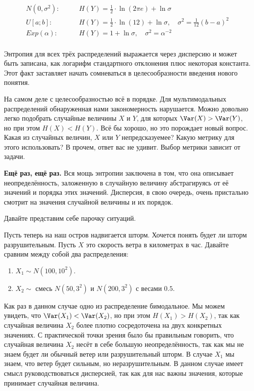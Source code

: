 \begin{equation*}
\begin{aligned}
 N(0,\sigma^2):  \qquad  &H(Y)  = \frac{1}{2} \cdot \ln(2 \pi e) + \ln \sigma \\
 U[a;b]:         \qquad     &H(Y) = \frac{1}{2} \cdot \ln(12) + \ln \sigma,  \quad  \sigma^2 = \frac{1}{12}(b-a)^2 \\ 
 Exp(\alpha):      \qquad &H(Y) = 1 + \ln \sigma, \quad \sigma^2 = \alpha^{-2}\\
\end{aligned}
\end{equation*}

 Энтропия для всех трёх распределений выражается через дисперсию и может быть записана, как логарифм стандартного отклонения плюс некоторая константа. Этот факт заставляет начать сомневаться в целесообразности введения нового понятия.

На самом деле с целесообразностью всё в порядке. Для мультимодальных распределений обнаруженная нами закономерность нарушается. Можно довольно легко подобрать случайные величины $X$ и $Y$, для которых $\Var(X) > \Var(Y)$, но при этом $H(X) < H(Y)$. Всё бы хорошо, но это порождает новый вопрос. Какая из случайных величин, $X$ или $Y$ непредсказуемее? Какую метрику для этого использовать? В прочем, ответ вас не удивит. Выбор метрики зависит от задачи. 

\textbf{Ещё раз, ещё раз.}  Вся мощь энтропии заключена в том, что она описывает неопределённость, заложенную в случайную величину абстрагируясь от её значений и порядка этих значений.  Дисперсия, в свою очередь, очень пристально смотрит на значения случайной величины и их порядок. 

Давайте представим себе парочку ситуаций. 


Пусть теперь на наш остров надвигается шторм. Хочется понять будет ли шторм разрушительным. Пусть $X$ это скорость ветра в километрах в час.   Давайте сравним между собой два распределения: 

\begin{enumerate}
\item $X_1 \sim N(100, 10^2)$. 

\item $X_2 \sim $  смесь $N(50, 3^2)$ и $N(200, 3^2)$ с весами $0.5$. 
\end{enumerate}

Как раз в данном случае одно из распределение бимодальное. Мы можем увидеть, что $\Var(X_1) <  \Var(X_2)$, но при этом $H(X_1) >  H(X_2)$, так как случайная величина $X_2$ более плотно сосредоточена на двух конкретных значениях.  С практической точки зрения было бы правильным говорить, что случайная величина $X_2$ несёт в себе большую неопределённость, так как  мы не знаем будет ли обычный ветер или разрушительный шторм. В случае $X_1$ мы знаем, что ветер будет сильным, но неразрушительным. В данном случае имеет смысл руководствоваться дисперсией, так как для нас важны значения, которые принимает случайная величина. 



